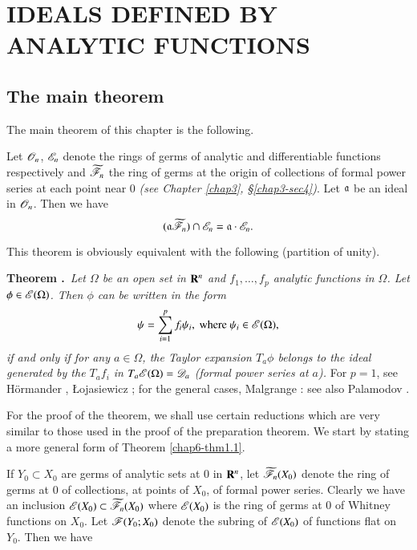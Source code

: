 \chapter{IDEALS DEFINED BY ANALYTIC FUNCTIONS}\label{chap6}

\section{The main theorem}\label{chap6-sec1}

The main theorem of this chapter is the following.

\begin{theorem}\label{chap6-thm1.1}
Let $\mathscr{O}_{n}$, $\mathscr{E}_{n}$ denote the rings of germs of analytic and differentiable functions respectively and $\widetilde{\mathscr{F}}_{n}$ the ring of germs at the origin of collections of formal power series at each point near $0$ {\em (see Chapter \ref{chap3}, \S\ref{chap3-sec4})}. Let $\mathfrak{a}$ be an ideal in $\mathscr{O}_{n}$. Then we have
$$
(\mathfrak{a}\widetilde{\mathscr{F}}_{n})\cap\mathscr{E}_{n}=\mathfrak{a}\cdot \mathscr{E}_{n}.
$$
\end{theorem}

This theorem is obviously equivalent with the following (partition of unity).

\medskip
\noindent
{\bf Theorem .\label{chap6-thm1.1'}}~{\em Let $\Omega$ be an open set in $\mathbf{R}^{n}$ and $f_{1},\ldots,f_{p}$ analytic functions in $\Omega$. Let $\phi\in\mathscr{E}(\Omega)$. Then $\phi$ can be written in the form}
$$
\psi =\sum\limits^{p}_{i=1}f_{i}\psi_{i},\text{ where } \psi_{i}\in \mathscr{E}(\Omega),
$$
{\em if and only if for any $a\in \Omega$, the Taylor expansion $T_{a}\phi$ belongs to the ideal generated by the $T_{a}f_{i}$ in $T_{a}\mathscr{E}(\Omega)=\mathscr{D}_{a}$ (formal power series at $a$).} For $p=1$, see H\"ormander \cite{L. Hormander : 1}, {\L}ojasiewicz \cite{S. Lojasiewicz : 1}; for the general cases, Malgrange \cite{B. Malgrange : 1}: see also Palamodov \cite{V. P. Palamodov : 1}.

For the proof of the theorem, we shall use certain reductions which are very similar to those used in the proof of the preparation theorem. We start by stating a more general form of Theorem \ref{chap6-thm1.1}.

If $Y_{0}\subset X_{0}$ are germs of analytic sets at $0$ in $\mathbf{R}^{n}$, let $\widetilde{\mathscr{F}}_{n}(X_{0})$ denote the ring of germs at $0$ of collections, at points of $X_{0}$, of formal power series. Clearly we have an inclusion $\mathscr{E}(X_{0})\subset \widetilde{\mathscr{F}}_{n}(X_{0})$ where $\mathscr{E}(X_{0})$ is the ring of germs at $0$ of Whitney functions on $X_{0}$. Let $\mathscr{F}(Y_{0};X_{0})$ denote the subring of $\mathscr{E}(X_{0})$ of functions flat on $Y_{0}$. Then we have

